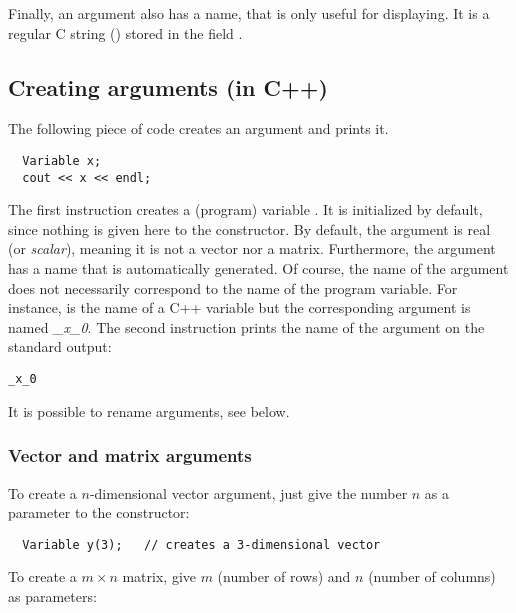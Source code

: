 Finally, an argument also has a name, that is only useful for displaying. It is a 
regular C string () stored in the field .





\subsection{Creating arguments (in C++)}\label{sec:mod-var-cpp}

The following piece of code creates an argument  and prints it.

\begin{lstlisting}
  Variable x;
  cout << x << endl;
\end{lstlisting}

The first instruction creates a (program) variable . It is initialized by default, since
nothing is given here to the constructor.
By default, the argument is real (or {\it scalar}), meaning it is not a vector nor a matrix. 
Furthermore, the argument has a name that is automatically
generated. Of course, the name of the argument does not necessarily correspond to the name of the 
program variable.
For instance,  is the name of a C++ variable but the corresponding argument is named {\it \_x\_0}.
The second instruction prints the name of the argument on the standard output:

\begin{lstlisting}
_x_0
\end{lstlisting}

It is possible to rename arguments, see below. %

\subsubsection{Vector and matrix arguments}\label{sec:mod-var-vec}
To create a $n$-dimensional vector argument, just
give the number $n$ as a parameter to the constructor:

\begin{lstlisting}
  Variable y(3);   // creates a 3-dimensional vector
\end{lstlisting}

To create a $m\times n$ matrix, give $m$ (number of rows) and $n$ (number of columns) as parameters:

